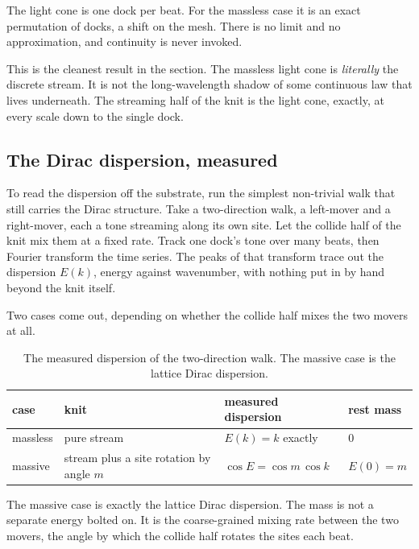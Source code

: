\begin{result}
The light cone is one dock per beat. For the massless case it is an exact permutation of docks, a shift on the
mesh. There is no limit and no approximation, and continuity is never invoked.
\end{result}

This is the cleanest result in the section. The massless light cone is \emph{literally} the discrete stream. It is
not the long-wavelength shadow of some continuous law that lives underneath. The streaming half of the knit is the
light cone, exactly, at every scale down to the single dock.

\subsection{The Dirac dispersion, measured}

To read the dispersion off the substrate, run the simplest non-trivial walk that still carries the Dirac structure.
Take a two-direction walk, a left-mover and a right-mover, each a tone streaming along its own site. Let the collide
half of the knit mix them at a fixed rate. Track one dock's tone over many beats, then Fourier transform the time
series. The peaks of that transform trace out the dispersion $E(k)$, energy against wavenumber, with nothing put in
by hand beyond the knit itself.

Two cases come out, depending on whether the collide half mixes the two movers at all.

\begin{table}[ht]
\centering
\begin{tabular}{@{}llll@{}}
\toprule
case & knit & measured dispersion & rest mass \\
\midrule
massless & pure stream & $E(k) = k$ exactly & $0$ \\
massive & stream plus a site rotation by angle $m$ & $\cos E = \cos m \, \cos k$ & $E(0) = m$ \\
\bottomrule
\end{tabular}
\caption{The measured dispersion of the two-direction walk. The massive case is the lattice Dirac dispersion.}
\label{tab:dirac-dispersion}
\end{table}

The massive case is exactly the lattice Dirac dispersion. The mass is not a separate energy bolted on. It is the
coarse-grained mixing rate between the two movers, the angle by which the collide half rotates the sites each beat.

